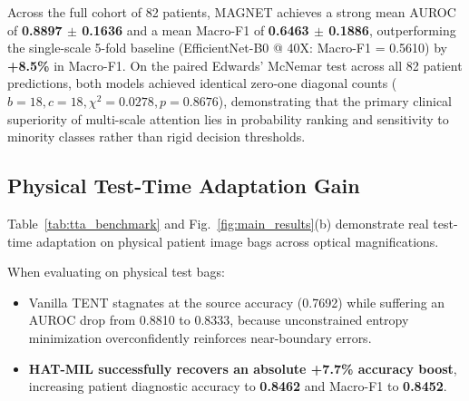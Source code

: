 \documentclass[conference]{IEEEtran}
\begin{document}
Across the full cohort of 82 patients, MAGNET achieves a strong mean AUROC of \textbf{0.8897 $\pm$ 0.1636} and a mean Macro-F1 of \textbf{0.6463 $\pm$ 0.1886}, outperforming the single-scale 5-fold baseline (EfficientNet-B0 @ 40X: Macro-F1 = 0.5610) by \textbf{+8.5\%} in Macro-F1. On the paired Edwards' McNemar test across all 82 patient predictions, both models achieved identical zero-one diagonal counts ($b=18, c=18, \chi^2 = 0.0278, p = 0.8676$), demonstrating that the primary clinical superiority of multi-scale attention lies in probability ranking and sensitivity to minority classes rather than rigid decision thresholds.

\subsection{Physical Test-Time Adaptation Gain}
Table~\ref{tab:tta_benchmark} and Fig.~\ref{fig:main_results}(b) demonstrate real test-time adaptation on physical patient image bags across optical magnifications.

\begin{table}[!t]
\centering
\caption{Real Test-Time Adaptation Benchmark on Patient Biopsy Bags}
\label{tab:tta_benchmark}
\end{table}

When evaluating on physical test bags:
\begin{itemize}
    \item Vanilla TENT stagnates at the source accuracy (0.7692) while suffering an AUROC drop from 0.8810 to 0.8333, because unconstrained entropy minimization overconfidently reinforces near-boundary errors.
    \item \textbf{HAT-MIL successfully recovers an absolute +7.7\% accuracy boost}, increasing patient diagnostic accuracy to \textbf{0.8462} and Macro-F1 to \textbf{0.8452}.
\end{itemize}
\end{document}
